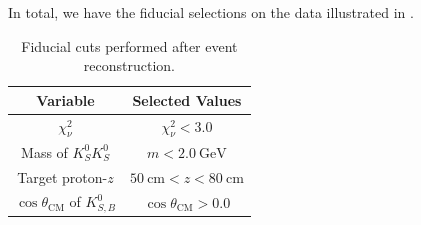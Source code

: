 In total, we have the fiducial selections on the data illustrated in .

\begin{table}
  \begin{center}
    \begin{tabular}{cc}\toprule
      Variable & Selected Values \\\midrule
      $\chi^2_\nu$ & $\chi^2_\nu < 3.0$ \\
      Mass of $K_S^0K_S^0$ & $ m < \SI{2.0}{\giga\electronvolt} $ \\
      Target proton-$z$ & $\SI{50}{\centi\meter} < z < \SI{80}{\centi\meter}$ \\
      $\cos\theta_{\text{CM}}$ of $K_{S,B}^0$ & $ \cos\theta_{\text{CM}} > 0.0 $ \\\bottomrule
    \end{tabular}
    \caption{Fiducial cuts performed after event reconstruction.}\label{tab:fiducial-cuts}
  \end{center}
\end{table}
